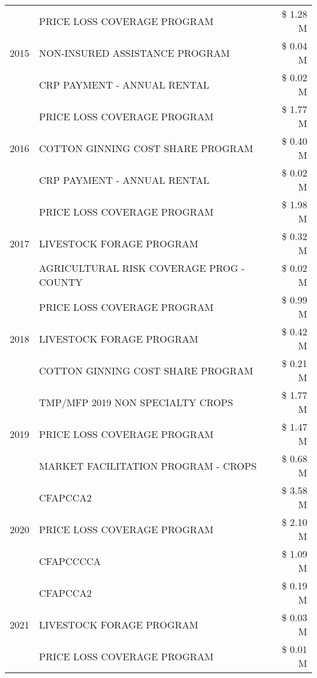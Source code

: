 \begin{tabular}{llr}
\multirow[t]{3}{*}{2015} & PRICE LOSS COVERAGE PROGRAM & \$ 1.28 M \\
 & NON-INSURED ASSISTANCE PROGRAM & \$ 0.04 M \\
 & CRP PAYMENT - ANNUAL RENTAL & \$ 0.02 M \\
\cline{1-3}
\multirow[t]{3}{*}{2016} & PRICE LOSS COVERAGE PROGRAM                   & \$ 1.77 M \\
 & COTTON GINNING COST SHARE PROGRAM             & \$ 0.40 M \\
 & CRP PAYMENT - ANNUAL RENTAL                   & \$ 0.02 M \\
\cline{1-3}
\multirow[t]{3}{*}{2017} & PRICE LOSS COVERAGE PROGRAM & \$ 1.98 M \\
 & LIVESTOCK FORAGE PROGRAM & \$ 0.32 M \\
 & AGRICULTURAL RISK COVERAGE PROG - COUNTY & \$ 0.02 M \\
\cline{1-3}
\multirow[t]{3}{*}{2018} & PRICE LOSS COVERAGE PROGRAM & \$ 0.99 M \\
 & LIVESTOCK FORAGE PROGRAM & \$ 0.42 M \\
 & COTTON GINNING COST SHARE PROGRAM & \$ 0.21 M \\
\cline{1-3}
\multirow[t]{3}{*}{2019} & TMP/MFP 2019 NON SPECIALTY CROPS & \$ 1.77 M \\
 & PRICE LOSS COVERAGE PROGRAM & \$ 1.47 M \\
 & MARKET FACILITATION PROGRAM - CROPS & \$ 0.68 M \\
\cline{1-3}
\multirow[t]{3}{*}{2020} & CFAPCCA2 & \$ 3.58 M \\
 & PRICE LOSS COVERAGE PROGRAM & \$ 2.10 M \\
 & CFAPCCCCA & \$ 1.09 M \\
\cline{1-3}
\multirow[t]{3}{*}{2021} & CFAPCCA2 & \$ 0.19 M \\
 & LIVESTOCK FORAGE PROGRAM & \$ 0.03 M \\
 & PRICE LOSS COVERAGE PROGRAM & \$ 0.01 M \\
\cline{1-3}
\bottomrule
\end{tabular}
